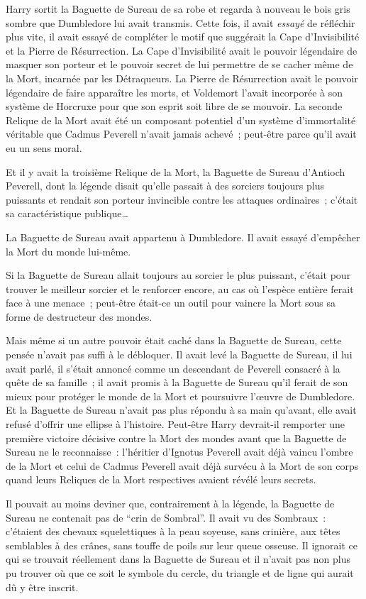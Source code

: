 Harry sortit la Baguette de Sureau de sa robe et regarda à nouveau le bois gris sombre que Dumbledore lui avait transmis.
Cette fois, il avait \emph{essayé} de réfléchir plus vite, il avait essayé de compléter le motif que suggérait la Cape d'Invisibilité et la Pierre de Résurrection.
La Cape d'Invisibilité avait le pouvoir légendaire de masquer son porteur et le pouvoir secret de lui permettre de se cacher même de la Mort, incarnée par les Détraqueurs.
La Pierre de Résurrection avait le pouvoir légendaire de faire apparaître les morts, et Voldemort l'avait incorporée à son système de Horcruxe pour que son esprit soit libre de se mouvoir.
La seconde Relique de la Mort avait été un composant potentiel d'un système d'immortalité véritable que Cadmus Peverell n'avait jamais achevé~; peut-être parce qu'il avait eu un sens moral.

Et il y avait la troisième Relique de la Mort, la Baguette de Sureau d'Antioch Peverell, dont la légende disait qu'elle passait à des sorciers toujours plus puissants et rendait son porteur invincible contre les attaques ordinaires~; c'était sa caractéristique publique…

La Baguette de Sureau avait appartenu à Dumbledore.
Il avait essayé d'empêcher la Mort du monde lui-même.

Si la Baguette de Sureau allait toujours au sorcier le plus puissant, c'était pour trouver le meilleur sorcier et le renforcer encore, au cas où l'espèce entière ferait face à une menace~; peut-être était-ce un outil pour vaincre la Mort sous sa forme de destructeur des mondes.

Mais même si un autre pouvoir était caché dans la Baguette de Sureau, cette pensée n'avait pas suffi à le débloquer.
Il avait levé la Baguette de Sureau, il lui avait parlé, il s'était annoncé comme un descendant de Peverell consacré à la quête de sa famille~; il avait promis à la Baguette de Sureau qu'il ferait de son mieux pour protéger le monde de la Mort et poursuivre l'œuvre de Dumbledore.
Et la Baguette de Sureau n'avait pas plus répondu à sa main qu'avant, elle avait refusé d'offrir une ellipse à l'histoire.
Peut-être Harry devrait-il remporter une première victoire décisive contre la Mort des mondes avant que la Baguette de Sureau ne le reconnaisse~: l'héritier d'Ignotus Peverell avait déjà vaincu l'ombre de la Mort et celui de Cadmus Peverell avait déjà survécu à la Mort de son corps quand leurs Reliques de la Mort respectives avaient révélé leurs secrets.

Il pouvait au moins deviner que, contrairement à la légende, la Baguette de Sureau ne contenait pas de “crin de Sombral”.
Il avait vu des Sombraux~: c'étaient des chevaux squelettiques à la peau soyeuse, sans crinière, aux têtes semblables à des crânes, sans touffe de poils sur leur queue osseuse.
Il ignorait ce qui se trouvait réellement dans la Baguette de Sureau et il n'avait pas non plus pu trouver où que ce soit le symbole du cercle, du triangle et de ligne qui aurait dû y être inscrit.

